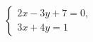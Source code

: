\begin{ex}
	\begin{condition}
		\( \left\{
		\begin{array}{l}
			2x-3y+7=0,\\
			3x+4y=1
		\end{array}
		\right. \)
	\end{condition}
\end{ex}